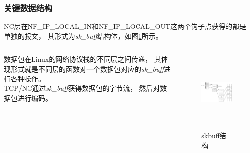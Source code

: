 \begin{frame}
	\frametitle{关键数据结构}
	NC层在NF\_IP\_LOCAL\_IN和NF\_IP\_LOCAL\_OUT这两个钩子点获得的都是单独的报文，
	其形式为\emph{sk\_buff}结构体，如图\ref{fig:skbuff}所示。
		\begin{columns}
		\begin{column}{0.5\textwidth}
			数据包在Linux的网络协议栈的不同层之间传递，
			其体现形式就是不同层的函数对一个数据包对应的\emph{sk\_buff}进行各种操作。
			\\
			TCP/NC通过\emph{sk\_buff}获得数据包的字节流，
			然后对数据包进行编码。
		\end{column}
		\begin{column}{0.4\textwidth}
			\vspace{-2em}
			\begin{figure}
				\includegraphics[height=4cm]{../figures/skbuff.eps}
				\caption{skbuff结构}
				\label{fig:skbuff}
			\end{figure}
		\end{column}
	\end{columns}
	
\end{frame}
